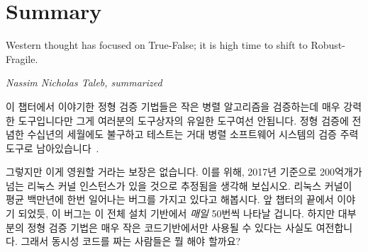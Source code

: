 \iffalse

It would be very helpful to have a tool that could somehow locate
all race conditions.
A number of such tools exist, for example,
\cref{sec:formal:State-Space Search} provides an
introduction to the general-purpose state-space search tools Promela and Spin,
\cref{sec:formal:Special-Purpose State-Space Search}
similarly introduces the special-purpose ppcmem tool,
\cref{sec:formal:Axiomatic Approaches}
looks at an example axiomatic approach,
\cref{sec:formal:SAT Solvers}
briefly overviews SAT solvers,
\cref{sec:formal:Stateless Model Checkers}
briefly overviews stateless model checkers,
\cref{sec:formal:Summary}
sums up use of formal-verification tools for verifying parallel algorithms,
and finally
\cref{sec:formal:Choosing a Validation Plan}
discusses how to decide how much and what type of validation to apply
to a given software project.

\fi








\section{Summary}
\label{sec:formal:Summary}
%
\epigraph{Western thought has focused on True-False;
	  it is high time to shift to Robust-Fragile.}
	 {\emph{Nassim Nicholas Taleb, summarized}}

이 챕터에서 이야기한 정형 검증 기법들은 작은 병렬 알고리즘을 검증하는데 매우
강력한 도구입니다만 그게 여러분의 도구상자의 유일한 도구여선 안됩니다.
정형 검증에 전념한 수십년의 세월에도 불구하고 테스트는 거대 병렬 소프트웨어
시스템의 검증 주력 도구로
남아있습니다~\cite{JonathanCorbet2006lockdep,DaveJones2011Trinity,PaulEMcKenney2016Formal}.

그렇지만 이게 영원할 거라는 보장은 없습니다.
이를 위해, 2017년 기준으로 200억개가 넘는 리눅스 커널 인스턴스가 있을 것으로
추정됨을 생각해 보십시오.
리눅스 커널이 평균 백만년에 한번 일어나는 버그를 가지고 있다고 해봅시다.
앞 챕터의 끝에서 이야기 되었듯, 이 버그는 이 전체 설치 기반에서 \emph{매일}
50번씩 나타날 겁니다.
하지만 대부분의 정형 검증 기법은 매우 작은 코드기반에서만 사용될 수 있다는
사실도 여전합니다.
그래서 동시성 코드를 짜는 사람들은 뭘 해야 할까요?

